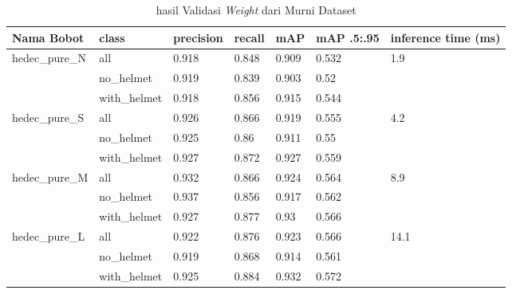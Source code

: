 \begin{table}[ht]
  \centering
  \caption{hasil Validasi \emph{Weight} dari Murni Dataset}
  \label{tb:nopretrain}
  \begin{tabular}{|l|l|l|l|l|l|l|} 
  \hline
  Nama Bobot                          & class        & precision & recall & mAP   & mAP .5:.95 & inference time (ms)    \\ 
  \hline
  \multirow{3}{*}{hedec\_pure\_N}     & all          & 0.918     & 0.848  & 0.909 & 0.532      & \multirow{3}{*}{1.9}   \\
                                      & no\_helmet   & 0.919     & 0.839  & 0.903 & 0.52       &                        \\
                                      & with\_helmet & 0.918     & 0.856  & 0.915 & 0.544      &                        \\ 
  \hline
  \multirow{3}{*}{hedec\_pure\_S}     & all          & 0.926     & 0.866  & 0.919 & 0.555      & \multirow{3}{*}{4.2}   \\
                                      & no\_helmet   & 0.925     & 0.86   & 0.911 & 0.55       &                        \\
                                      & with\_helmet & 0.927     & 0.872  & 0.927 & 0.559      &                        \\ 
  \hline
  \multirow{3}{*}{hedec\_pure\_M}     & all          & 0.932     & 0.866  & 0.924 & 0.564      & \multirow{3}{*}{8.9}   \\
                                      & no\_helmet   & 0.937     & 0.856  & 0.917 & 0.562      &                        \\
                                      & with\_helmet & 0.927     & 0.877  & 0.93  & 0.566      &                        \\ 
  \hline
  \multirow{3}{*}{hedec\_pure\_L}     & all          & 0.922     & 0.876  & 0.923 & 0.566      & \multirow{3}{*}{14.1}  \\
                                      & no\_helmet   & 0.919     & 0.868  & 0.914 & 0.561      &                        \\
                                      & with\_helmet & 0.925     & 0.884  & 0.932 & 0.572      &                        \\
  \hline
  \end{tabular}
\end{table}

